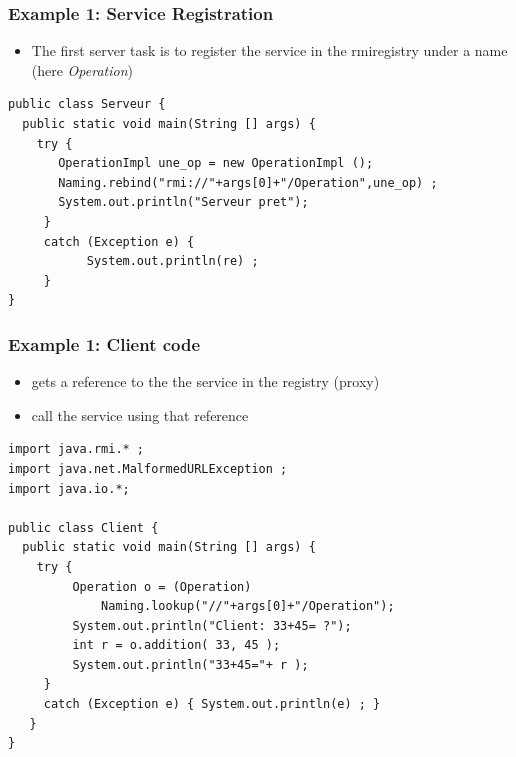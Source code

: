 \documentclass[bigger,hyperref={colorlinks=true, urlcolor=red, plainpages=false, pdfpagelabels, bookmarksnumbered}]{beamer}
\begin{document}
\begin{frame}[fragile]
\frametitle{Example 1: Service Registration}
\label{sec-3-10}

\begin{itemize}
\item The first server task is to register the service 
  in the rmiregistry under a name (here \emph{Operation})
\end{itemize}


\lstset{language=java}
\begin{lstlisting}
public class Serveur {
  public static void main(String [] args) {
    try {
       OperationImpl une_op = new OperationImpl ();
       Naming.rebind("rmi://"+args[0]+"/Operation",une_op) ;
       System.out.println("Serveur pret");
     }
     catch (Exception e) { 
           System.out.println(re) ; 
     }
}
\end{lstlisting}
\end{frame}
\begin{frame}[fragile]
\frametitle{Example 1: Client code}
\label{sec-3-11}

\begin{itemize}
\item gets a reference to the  the service in the registry (proxy)
\item call the service using that reference
\end{itemize}


\lstset{language=java}
\begin{lstlisting}
import java.rmi.* ;
import java.net.MalformedURLException ;
import java.io.*;

public class Client {
  public static void main(String [] args) {
    try {
         Operation o = (Operation) 
             Naming.lookup("//"+args[0]+"/Operation");
         System.out.println("Client: 33+45= ?");
         int r = o.addition( 33, 45 );
         System.out.println("33+45="+ r );
     }
     catch (Exception e) { System.out.println(e) ; }
   }
}
\end{lstlisting}
\end{frame}
\end{document}
